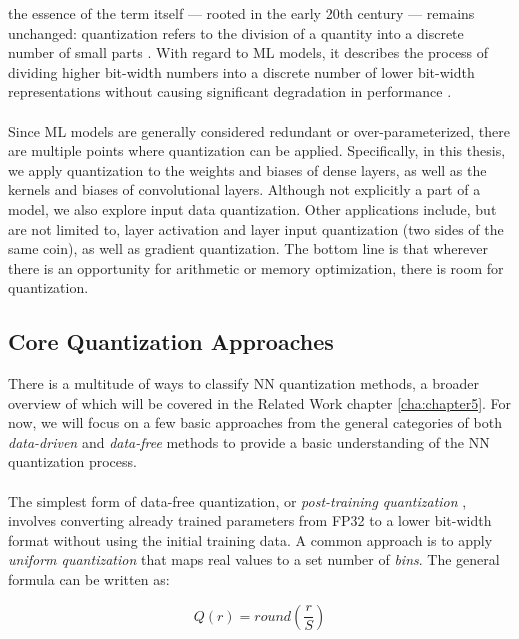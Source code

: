 the essence of the term itself — rooted in the early 20th century — remains unchanged:
quantization refers to the division of a quantity into a discrete number
of small parts \cite{gray1998quantization}. With regard to ML models, 
it describes the process of dividing higher bit-width numbers into a discrete number of lower bit-width representations
without causing significant degradation in performance \cite{gholami2021survey}.
\\
\\
Since ML models are generally considered redundant or over-parameterized,
there are multiple points where quantization can be applied.
Specifically, in this thesis, we apply quantization to the weights and biases of dense layers, 
as well as the kernels and biases of convolutional layers. 
Although not explicitly a part of a model, we also explore input data quantization. 
Other applications include, but are not limited to, layer activation and layer input quantization (two sides of the same coin),
as well as gradient quantization. The bottom line is that wherever there is an opportunity for arithmetic or memory optimization,
there is room for quantization.


\subsection{Core Quantization Approaches}
\label{subsec:commonquantizationapproaches}

There is a multitude of ways to classify NN quantization methods, a broader overview of which will be covered
in the Related Work chapter \ref{cha:chapter5}.
For now, we will focus on a few basic approaches from the general categories of both 
\textit{data-driven} and \textit{data-free} methods \cite{Edouard2022SPIQ} to provide a basic understanding of the NN quantization process.
\\
\\
The simplest form of data-free quantization, or \textit{post-training quantization} \cite{jiang2021efficient},
involves converting already trained parameters from FP32 to a lower bit-width format
without using the initial training data. 
A common approach is to apply \textit{uniform quantization} that maps real values to a set number
of \textit{bins}. The general formula can be written as:

\[
Q(r) = round(\frac{r}{S})
\]

